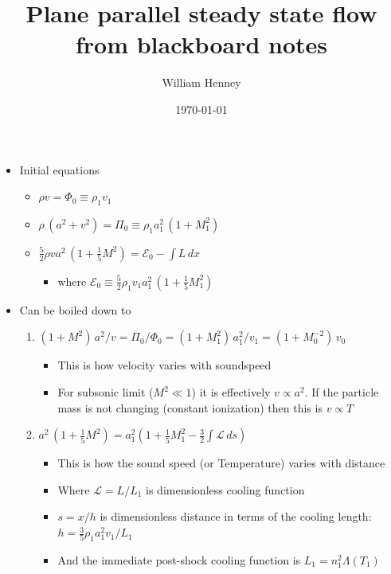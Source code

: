 \documentclass[11pt]{article}
\author{William Henney}
\date{\today}
\title{Plane parallel steady state flow from blackboard notes}
\begin{document}
\maketitle
\tableofcontents

\begin{itemize}
\item Initial equations
\begin{itemize}
\item \(\rho v = \Phi_{0} \equiv \rho_{1} v_{1}\)
\item \(\rho \, (a^{2} + v^2) = \Pi_{0} \equiv \rho_{1} a_{1}^{2} \, (1 + M_{1}^{2})\)
\item \(\frac52 \rho v a^{2} \, (1 + \frac15 M^{2}) = \mathcal{E}_{0} - \int L\, dx\)
\begin{itemize}
\item where \(\mathcal{E}_{0} \equiv \frac52 \rho_{1} v_{1} a_{1}^{2 }\, (1 + \frac15 M_{1}^{2})\)
\end{itemize}
\end{itemize}
\item Can be boiled down to
\begin{enumerate}
\item \((1 + M^{2}) \, a^{2}/v = \Pi_{0}/\Phi_{0} = (1 + M_{1}^{2}) \, a_{1}^{2}/v_{1} = (1 + M_{0}^{-2}) \, v_{0}\)
\begin{itemize}
\item This is how velocity varies with soundspeed
\item For subsonic limit (\(M^{2} \ll 1\)) it is effectively \(v \propto a^{2}\).  If the particle mass is not changing (constant ionization) then this is \(v \propto T\)
\end{itemize}
\item \(a^{2} \, (1 + \frac15 M^{2}) = a_{1}^{2} \left( 1 + \frac15 M_{1}^{2} - \frac32 \int \mathcal{L} \, ds \right)\)
\begin{itemize}
\item This is how the sound speed (or Temperature) varies with distance
\item Where \(\mathcal{L} = L / L_{1}\) is dimensionless cooling function
\item \(s = x / h\) is dimensionless distance in terms of the cooling length: \(h = \frac35 \rho_{1} a_{1}^{2} v_{1} / L_{1}\)
\item And the immediate post-shock cooling function is \(L_{1} = n_{1}^{2} \Lambda(T_{1})\)
\end{itemize}
\end{enumerate}
\end{itemize}
\end{document}
